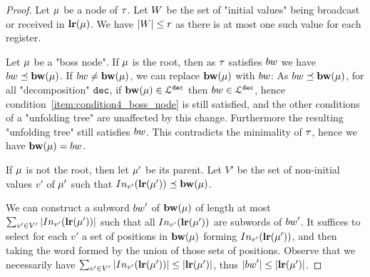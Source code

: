 \lemBoundSuccessorHeight*

\begin{proof}
	Let $\mu$ be a node of $\tau$.
	Let $W$ be the set of "initial values" being broadcast or received in $\mathbf{lr}(\mu)$. We have $|W|\leq r$ as there is at most one such value for each register.  
	
%	
	
	Let $\mu$ be a "boss node". If $\mu$ is the root, then as $\tau$ satisfies $\bossspec$ we have $\bossspec \subword \bosslabel{\node}$. If $\bossspec \neq \bosslabel{\node}$, we can replace $\mathbf{bw}(\mu)$ with $\bossspec$: As $\bossspec \subword \bosslabel{\node}$, for all "decomposition" $\mathtt{dec}$, if $\mathbf{bw}(\mu) \in \mathcal{L}^{\mathtt{\mathtt{dec}}}$ then $\bossspec \in \langdec{\decsymb}$, hence condition~\ref{item:condition4_boss_node} is still satisfied, and the other conditions of a "unfolding tree" are unaffected by this change.
	Furthermore the resulting "unfolding tree" still satisfies $\bossspec$. This contradicts the minimality of $\tau$, hence we have $\bosslabel{\node} = \bossspec$.
	
	If $\mu$ is not the root, then let $\mu'$ be its parent. 
	Let $V'$ be the set of non-initial values $v'$ of $\mu'$ such that $\vinput{v'}{\localrunlabel{\node'}} \subword \bosslabel{\node}$.
	
	We can construct a subword $\bossspec'$ of $\mathbf{bw}(\mu)$ of length at most $\sum_{v' \in V'} \size{\vinput{v'}{\localrunlabel{\node'}}}$ such that all $\vinput{v'}{\localrunlabel{\node'}}$ are subwords of $\bossspec'$. It suffices to select for each $v'$ a set of positions in $\mathbf{bw}(\mu)$ forming $\vinput{v'}{\localrunlabel{\node'}}$, and then taking the word formed by the union of those sets of positions.
	Observe that we necessarily have $\sum_{v' \in V'} \size{\vinput{v'}{\localrunlabel{\node'}}} \leq \size{\localrunlabel{\node'}}$, thus $\size{\bossspec'} \leq \size{\localrunlabel{\node'}}$.
	

\end{proof}

